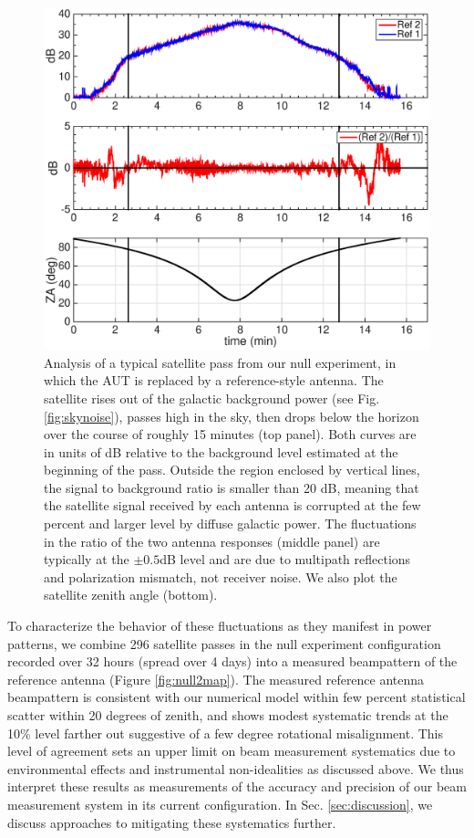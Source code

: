 \begin{figure}
\includegraphics[width=6.5in]{chap1_precision_beammapping_figures/null2sat23_pass75332.eps}
\caption[Analysis of a typical satellite pass from our null experiment.]{Analysis of a typical satellite pass from our null experiment, in which the AUT is replaced by a reference-style antenna. The satellite rises out of the galactic background power (see Fig. \ref{fig:skynoise}), passes high in the sky, then drops below the horizon over the course of roughly 15 minutes (top panel). Both curves are in units of dB relative to the background level estimated at the beginning of the pass. Outside the region enclosed by vertical lines, the signal to background ratio is smaller than 20 dB, meaning that the satellite signal received by each antenna is corrupted at the few percent and larger level by diffuse galactic power.  The fluctuations in the ratio of the two antenna responses (middle panel) are typically at the $\pm0.5$dB level  and are due to multipath reflections and polarization mismatch, not receiver noise. We also plot the satellite zenith angle (bottom).}
\label{fig:satellitepass}
\end{figure}


To characterize the behavior of these fluctuations as they manifest in power patterns, we combine 296 satellite passes in the null experiment configuration recorded over 32 hours (spread over 4 days) into a measured beampattern of the reference antenna (Figure \ref{fig:null2map}). The measured reference antenna beampattern is consistent with our numerical model within few percent statistical scatter within 20 degrees of zenith, and shows modest systematic trends at the 10\% level farther out suggestive of a few degree rotational misalignment. This level of agreement sets an upper limit on beam measurement systematics due to environmental effects and instrumental non-idealities as discussed above. We thus interpret these results as measurements of the accuracy and precision of our beam measurement system in its current configuration. In Sec. \ref{sec:discussion}, we discuss approaches to mitigating these systematics further.

